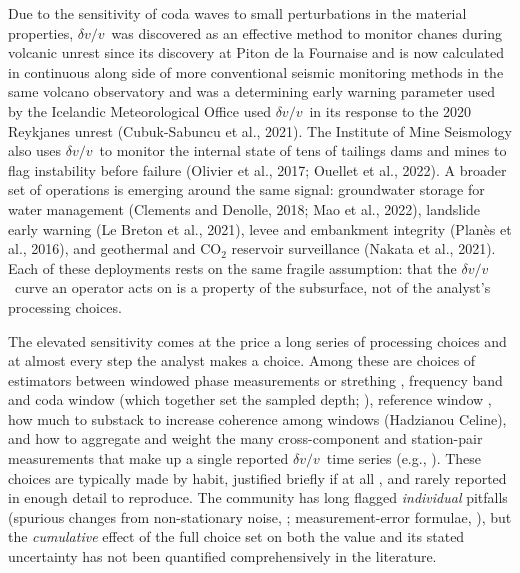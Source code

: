 \documentclass[
  referee]{gji}
\providecommand{\dvv}{\ensuremath{\delta v/v}}
\begin{document}
Due to the sensitivity of coda waves to small perturbations in the
material properties, \dvv~was discovered as an effective method to
monitor chanes during volcanic unrest since its discovery at Piton de la
Fournaise \citep{Brenguier2008} and is now calculated in continuous
along side of more conventional seismic monitoring methods in the same
volcano observatory \citep{Duputel2009} and was a determining early
warning parameter used by the Icelandic Meteorological Office used
\dvv~in its response to the 2020 Reykjanes unrest (Cubuk-Sabuncu et al.,
2021). The Institute of Mine Seismology also uses \dvv~to monitor the
internal state of tens of tailings dams and mines to flag instability
before failure (Olivier et al., 2017; Ouellet et al., 2022). A broader
set of operations is emerging around the same signal: groundwater
storage for water management (Clements and Denolle, 2018; Mao et al.,
2022), landslide early warning (Le Breton et al., 2021), levee and
embankment integrity (Planès et al., 2016), and geothermal and CO\(_2\)
reservoir surveillance (Nakata et al., 2021). Each of these deployments
rests on the same fragile assumption: that the \dvv~curve an operator
acts on is a property of the subsurface, not of the analyst's processing
choices.

The elevated sensitivity comes at the price a long series of processing
choices and at almost every step the analyst makes a choice. Among these
are choices of estimators between windowed phase measurements or
strething \citep[\citet{Mao2020}, \citet{Yuan2021}]{Mikesell2015},
frequency band and coda window (which together set the sampled depth;
\citeauthor{Obermann2013}
\citetext{\citeyear{Obermann2013}; \citealp{Obermann2016}}), reference
window \citep[\citet{Ermert2023}, \citet{Okubo24}]{Brenguier2014}, how
much to substack to increase coherence among windows (Hadzianou Celine),
and how to aggregate and weight the many cross-component and
station-pair measurements that make up a single reported \dvv~time
series (e.g., \citet{hobiger14}). These choices are typically made by
habit, justified briefly if at all , and rarely reported in enough
detail to reproduce. The community has long flagged \emph{individual}
pitfalls (spurious changes from non-stationary noise, \citet{Zhan2013};
measurement-error formulae, \citeauthor{Clarke2011}
\citetext{\citeyear{Clarke2011}; \citealp{Weaver2011}}), but the
\emph{cumulative} effect of the full choice set on both the value and
its stated uncertainty has not been quantified comprehensively in the
literature.
\end{document}
